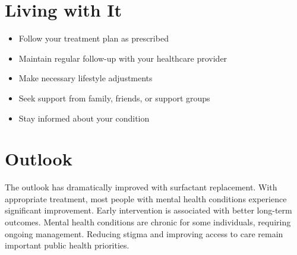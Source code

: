 \section{Living with It}
\begin{itemize}[noitemsep]
  \item Follow your treatment plan as prescribed
  \item Maintain regular follow-up with your healthcare provider
  \item Make necessary lifestyle adjustments
  \item Seek support from family, friends, or support groups
  \item Stay informed about your condition
\end{itemize}
\section{Outlook}
The outlook has dramatically improved with surfactant replacement. With appropriate treatment, most people with mental health conditions experience significant improvement. Early intervention is associated with better long-term outcomes. Mental health conditions are chronic for some individuals, requiring ongoing management. Reducing stigma and improving access to care remain important public health priorities.
